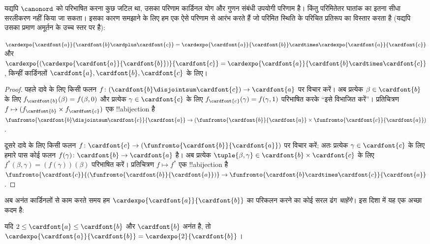 \documentclass[../../../include/open-logic-section]{subfiles}
\begin{document}


यद्यपि $\canonord$ को परिभाषित करना कुछ जटिल था, उसका परिणाम कार्डिनल योग
और गुणन संबंधी उपयोगी परिणाम  है। किंतु
परिमितेतर घातांक का इतना सीधा सरलीकरण नहीं किया जा सकता। इसका कारण समझाने
के लिए हम एक ऐसे परिणाम से आरंभ करते हैं जो परिमित स्थिति के परिचित प्रतिरूप
का विस्तार करता है (यद्यपि उसका प्रमाण अमूर्तन के उच्च स्तर पर है):

\begin{prop}
$\cardexpo{\cardfont{a}}{\cardfont{b} \cardplus \cardfont{c}} =
\cardexpo{\cardfont{a}}{\cardfont{b}} \cardtimes
\cardexpo{\cardfont{a}}{\cardfont{c}}$ और
$\cardexpo{(\cardexpo{\cardfont{a}}{\cardfont{b}})}{\cardfont{c}} =
\cardexpo{\cardfont{a}}{\cardfont{b} \cardtimes \cardfont{c}}$, किन्हीं
कार्डिनलों $\cardfont{a},\cardfont{b},\cardfont{c}$ के लिए।
\end{prop}

\begin{proof}
पहले दावे के लिए किसी फलन $f\colon
(\cardfont{b}\disjointsum\cardfont{c})\to\cardfont{a}$ पर विचार करें। अब
प्रत्येक $\beta\in\cardfont{b}$ के लिए
$f_\cardfont{b}(\beta)=f(\beta,0)$ और प्रत्येक
$\gamma\in\cardfont{c}$ के लिए
$f_\cardfont{c}(\gamma)=f(\gamma,1)$ परिभाषित करके ``इसे विभाजित करें''।
प्रतिचित्रण $f\mapsto(f_{\cardfont{b}}\times f_\cardfont{c})$ एक
!!a{bijection} है
$\funfromto{\cardfont{b} \disjointsum \cardfont{c}}{\cardfont{a}} \to
(\funfromto{\cardfont{b}}{\cardfont{a}} \times
\funfromto{\cardfont{c}}{\cardfont{a}})$. 

दूसरे दावे के लिए किसी फलन $f\colon\cardfont{c}\to
(\funfromto{\cardfont{b}}{\cardfont{a}})$ पर विचार करें; अतः प्रत्येक
$\gamma\in\cardfont{c}$ के लिए हमारे पास कोई फलन
$f(\gamma)\colon\cardfont{b}\to\cardfont{a}$ है। अब प्रत्येक
$\tuple{\beta,\gamma}\in\cardfont{b}\times\cardfont{c}$ के लिए
$f^*(\beta,\gamma)=(f(\gamma))(\beta)$ परिभाषित करें। प्रतिचित्रण
$f\mapsto f^*$ एक !!a{bijection} है
$\funfromto{\cardfont{c}}{(\funfromto{\cardfont{b}}{\cardfont{a}})}
\to \funfromto{\cardfont{b} \cardtimes \cardfont{c}}{\cardfont{a}}$. 
\end{proof}

अब अनंत कार्डिनलों से काम करते समय हम $\cardexpo{\cardfont{a}}{\cardfont{b}}$
का परिकलन करने का कोई सरल ढंग \emph{चाहेंगे}। इस दिशा में यह एक अच्छा कदम है:

\begin{prop}
यदि $2\leq\cardfont{a}\leq\cardfont{b}$ और $\cardfont{b}$ अनंत है, तो
$\cardexpo{\cardfont{a}}{\cardfont{b}}=\cardexpo{2}{\cardfont{b}}$।
\end{prop}
\end{document}
